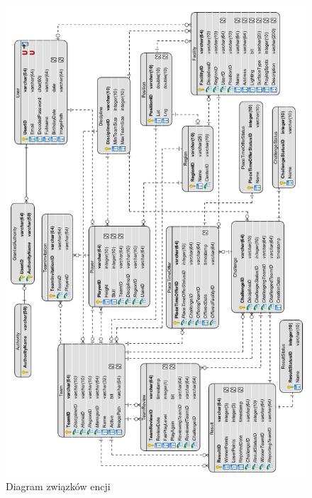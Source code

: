 \begin{figure}[H]
\centering
\includegraphics[width=0.85\linewidth]{04-projekt/rys/erdpoziom.PNG}
\caption{Diagram związków encji}
\label{fig:diagram-erd}
\end{figure}

